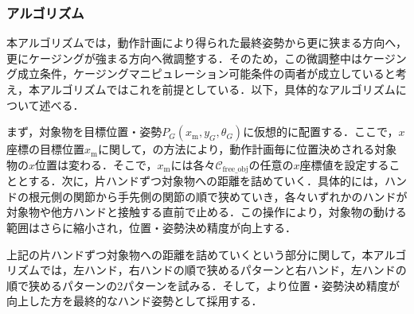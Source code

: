 \documentclass[a4paper,twoside,12pt,papersize, dvipdfmx]{iirthesis}
\begin{document}
\subsubsection{アルゴリズム}
本アルゴリズムでは，動作計画により得られた最終姿勢から更に狭まる方向へ，更にケージングが強まる方向へ微調整する．そのため，この微調整中はケージング成立条件，ケージングマニピュレーション可能条件の両者が成立していると考え，本アルゴリズムではこれを前提としている．以下，具体的なアルゴリズムについて述べる．\par
まず，対象物を目標位置・姿勢$P_G (x_{\mathrm m}, y_G, \theta_G)$に仮想的に配置する．ここで，$x$座標の目標位置$x_{\mathrm m}$に関して，の方法により，動作計画毎に位置決めされる対象物の$x$位置は変わる．そこで，$x_{\mathrm m}$には各々$\mathcal{C}_{\mathrm{free\_obj}}$の任意の$x$座標値を設定することとする．次に，片ハンドずつ対象物への距離を詰めていく．具体的には，ハンドの根元側の関節から手先側の関節の順で狭めていき，各々いずれかのハンドが対象物や他方ハンドと接触する直前で止める．この操作により，対象物の動ける範囲はさらに縮小され，位置・姿勢決め精度が向上する．\par
上記の片ハンドずつ対象物への距離を詰めていくという部分に関して，本アルゴリズムでは，左ハンド，右ハンドの順で狭めるパターンと右ハンド，左ハンドの順で狭めるパターンの2パターンを試みる．そして，より位置・姿勢決め精度が向上した方を最終的なハンド姿勢として採用する．
\end{document}
